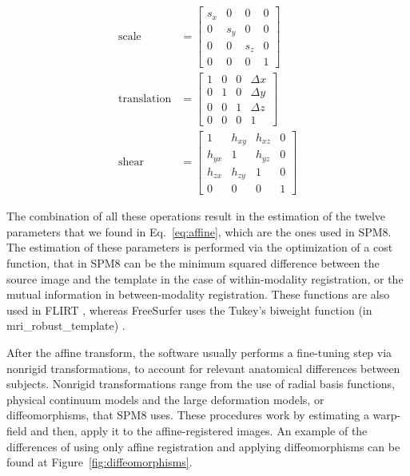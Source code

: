 \begin{align}
\label{eq:affine1}
	\text{scale} &= 
	\left[\begin{matrix}
		 s_x  &0 & 0 & 0\\
		0 &s_y &0 &0\\
		0 &0 &s_z &0\\
		0 &0 &0 &1		
	\end{matrix}
	\right]\\
	\label{eq:affine2}
	\text{translation} &= 
	\left[
	\begin{matrix}
	1  &0 & 0 & \Delta x\\
	0 &1 &0 &\Delta y\\
	0 &0 &1 &\Delta z\\
	0 &0 &0 &1		
	\end{matrix}
	\right] \\
	\label{eq:affine3}
	\text{shear} &= 
	\left[\begin{matrix}
	1  &h_{xy}& h_{xz} & 0\\
	h_{yx} &1 &h_{yz} &0\\
	h_{zx} &h_{zy} &1 &0\\
	0 &0 &0 &1		
	\end{matrix}
	\right]
\end{align}

The combination of all these operations result in the estimation of the twelve parameters that we found in Eq.~\ref{eq:affine}, which are the ones used in \ac{SPM8}. The estimation of these parameters is performed via the optimization of a cost function, that in \ac{SPM8} can be the minimum squared difference between the source image and the template \cite{spm_book} in the case of within-modality registration, or the mutual information in between-modality registration. These functions are also used in FLIRT \cite{Jenkinson2001}, whereas FreeSurfer uses the Tukey's biweight function (in {\ttfamily mri\_robust\_template}) \cite{Reuter2012}.

After the affine transform, the software usually performs a fine-tuning step via nonrigid transformations, to account for relevant a\-na\-to\-mi\-cal differences between subjects. Nonrigid transformations range from the use of radial basis functions, physical continuum models and the large deformation models, or diffeomorphisms, that \ac{SPM8} uses. These procedures work by estimating a warp-field and then, apply it to the affine-registered images. An example of the differences of using only affine registration and applying diffeomorphisms can be found at Figure~\ref{fig:diffeomorphisms}.

